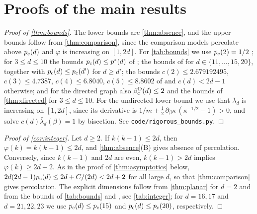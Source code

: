\documentclass[11pt,letterpaper]{article}
\begin{document}
\section{Proofs of the main results}\label{sec:proofs}

\begin{proof}[Proof of \cref{thm:bounds}]
The lower bounds are \cref{thm:absence}, and the upper bounds follow from \cref{thm:comparison}, since the comparison models percolate above $p_{\mathrm c}(d)$ and $\varphi$ is increasing on $[1,2d]$. For \cref{tab:bounds} we use $p_{\mathrm c}(2)=1/2$ \cite{Kes80}; for $3\le d\le10$ the bounds $p_{\mathrm c}(d)\le p^*(d)$ of \cite[Theorem~2.1]{GPS26}; the bounds of \cite[Theorem~1.2]{FvdH17} for $d\in\{11,\dots,15,20\}$, together with $p_{\mathrm c}(d)\le p_{\mathrm c}(d')$ for $d\ge d'$; the bounds $c(2)\le2.679192495$, $c(3)\le4.7387$, $c(4)\le6.8040$, $c(5)\le8.8602$ of \cite{PT00} and $c(d)<2d-1$ otherwise; and for the directed graph also $\beta_{\mathrm c}^{\mathrm D}(d)\le2$ \cite{CHJK26,LXZ26} and the bounds of \cref{thm:directed} for $3\le d\le10$. For the undirected lower bound we use that $\bar\lambda_d$ is increasing on $[1,2d]$, since its derivative is $1/m+\frac12\,\partial_\beta \kappa\,(\kappa^{-1/2}-1)>0$, and solve $c(d)\bar\lambda_d(\beta)=1$ by bisection. See \texttt{code/rigorous\_bounds.py}.
\end{proof}

\begin{proof}[Proof of \cref{cor:integer}]
Let $d\ge2$. If $k(k-1)\le2d$, then $\varphi(k)=k(k-1)\le2d$, and \cref{thm:absence}(B) gives absence of percolation. Conversely, since $k(k-1)$ and $2d$ are even, $k(k-1)>2d$ implies $\varphi(k)\ge2d+2$. As in the proof of \cref{thm:asymptotics} below, $2d(2d-1)p_{\mathrm c}(d)\le2d+C/(2d)<2d+2$ for all large $d$, so that \cref{thm:comparison} gives percolation. The explicit dimensions follow from \cref{thm:planar} for $d=2$ and from the bounds of \cref{tab:bounds} and \cite[Theorem~1.2]{FvdH17}, see \cref{tab:integer}; for $d=16,17$ and $d=21,22,23$ we use $p_{\mathrm c}(d)\le p_{\mathrm c}(15)$ and $p_{\mathrm c}(d)\le p_{\mathrm c}(20)$, respectively.
\end{proof}
\end{document}
